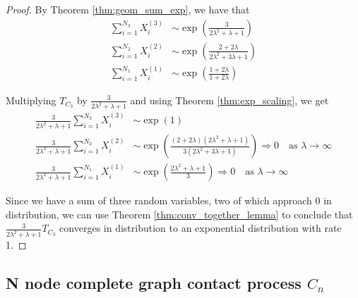 \documentclass{article}
\theoremstyle{plain}
\theoremstyle{definition}
\theoremstyle{remark}
\numberwithin{equation}{section}
\begin{document}
\begin{proof}
By Theorem \eqref{thm:geom_sum_exp}, we have that
\begin{align*}
    \sum_{i = 1}^{N_3} X_i^{(3)} &\sim \exp\left(
        \frac{3}{2\lambda^2 + \lambda + 1}
        \right) \\
    \sum_{i = 1}^{N_2} X_i^{(2)} &\sim \exp\left(
        \frac{2 + 2\lambda}{2 \lambda^2 + 3\lambda + 1}
    \right)\\
    \sum_{i = 1}^{N_1} X_i^{(1)} &\sim \exp\left(\frac{1 + 2\lambda}{1 + 2\lambda}\right)
\end{align*}

Multiplying $T_{C_3}$ by $\frac{3}{2 \lambda^2 + \lambda + 1}$ and using Theorem \eqref{thm:exp_scaling}, we get
\begin{align*}
    \frac{3}{2 \lambda^2 + \lambda + 1} \sum_{i = 1}^{N_3} X_i^{(3)} &\sim \exp\left(
        1
        \right)\\
    \frac{3}{2 \lambda^2 + \lambda + 1} \sum_{i = 1}^{N_2} X_i^{(2)} &\sim \exp\left(
        \frac{(2 + 2\lambda)(2 \lambda^2 + \lambda + 1)}{3 (2 \lambda^2 + 3\lambda + 1)}
    \right)  \Rightarrow 0 \quad \text{as } \lambda \to \infty\\
    \frac{3}{2 \lambda^2 + \lambda + 1} \sum_{i = 1}^{N_1} X_i^{(1)} &\sim \exp\left(
    \frac{2 \lambda^2 + \lambda + 1}{3}
    \right) \Rightarrow 0 \quad \text{as } \lambda \to \infty
\end{align*}

Since we have a sum of three random variables, two of which approach 0 in distribution, we can use Theorem \ref{thm:conv_together_lemma} to conclude that  $\frac{3}{2 \lambda^2 + \lambda + 1} T_{C_3}$ converges in distribution to an exponential distribution with rate 1.
\end{proof}

\subsection{N node complete graph contact process \texorpdfstring{$C_n$}{Cn}}

\end{document}
